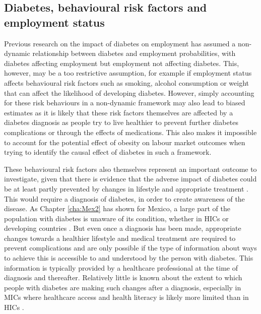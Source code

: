 \subsection{Diabetes, behavioural risk factors and employment status}

Previous research on the impact of diabetes on employment has assumed a non-dynamic relationship between diabetes and employment probabilities, with diabetes affecting employment but employment not affecting diabetes. This, however, may be a too restrictive assumption, for example if employment status affects behavioural risk factors such as smoking, alcohol consumption or weight that can affect the likelihood of developing diabetes. However, simply accounting for these risk behaviours in a non-dynamic framework may also lead to biased estimates as it is likely that these risk factors themselves are affected by a diabetes diagnosis as people try to live healthier to prevent further diabetes complications or through the effects of medications. This also makes it impossible to account for the potential effect of obesity on labour market outcomes when trying to identify the causal effect of diabetes in such a framework.

These behavioural risk factors also themselves represent an important outcome to investigate, given that there is evidence that the adverse impact of diabetes could be at least partly prevented by changes in lifestyle and appropriate treatment \parencite{Wareham2016}. This would require a diagnosis of diabetes, in order to create awareness of the disease. As Chapter \ref{cha:Mex2} has shown for Mexico, a large part of the population with diabetes is unaware of its condition, whether in \acp{HIC} or developing countries \parencite{Beagley2014}. But even once a diagnosis has been made, appropriate changes towards a healthier lifestyle and medical treatment are required to prevent complications and are only possible if the type of information about ways to achieve this is accessible to and understood by the person with diabetes. This information is typically provided by a healthcare professional at the time of diagnosis and thereafter. Relatively little is known about the extent to which people with diabetes are making such changes after a diagnosis, especially in \acp{MIC} where healthcare access and health literacy is likely more limited than in \acp{HIC} \parencite{Mills2014}.

